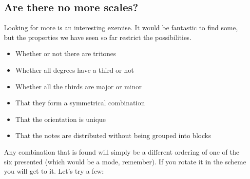 \documentclass[]{report}
\providecommand{\tightlist}{%
\setlength{\itemsep}{0pt}
\setlength{\parskip}{0pt}
}
\begin{document}
\subsection{Are there no more scales?}
Looking for more is an interesting exercise. It would be fantastic to find some, but the properties we have seen so far restrict the possibilities.
\begin{itemize} \tightlist
\item Whether or not there are tritones
\item Whether all degrees have a third or not
\item Whether all the thirds are major or minor
\item That they form a symmetrical combination
\item That the orientation is unique
\item That the notes are distributed without being grouped into blocks
\end{itemize}
Any combination that is found will simply be a different ordering of one of the six presented (which would be a mode, remember). If you rotate it in the scheme you will get to it. Let's try a few:
\end{document}
